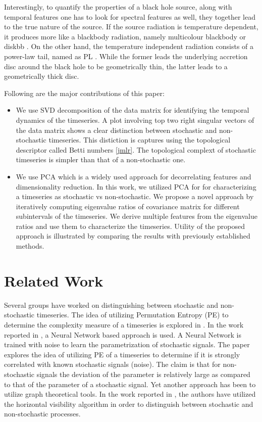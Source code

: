\documentclass[10pt,conference]{IEEEtran}
\begin{document}
Interestingly, to quantify the properties of a black hole source, along with temporal features one has to look for spectral features as well, they together lead to the true nature of the source. If the source radiation is temperature dependent, it produces more like a blackbody radiation, namely multicolour blackbody or diskbb \cite{Shakura1973}. On the other hand, the temperature independent radiation consists of a power-law tail, named as PL \cite{chakrabarti1995,narayan1994}.
While the former leads the underlying accretion disc around the black hole to be geometrically thin, the latter leads to a geometrically thick disc.


Following are the major contributions of this paper:
\begin{itemize}
  \item We use SVD decomposition of the data matrix for identifying the temporal dynamics of the timeseries. A plot involving top two right singular vectors of the data matrix shows a clear distinction between stochastic and non-stochastic timeseries. This distiction is captures using the topological descriptor called Betti numbers \ref{jmlr}. The topological complext of stochastic timeseries is simpler than that of a non-stochastic one.
  \item We use PCA which is a widely used approach for decorrelating features and dimensionality reduction. In this work, we utilized PCA for  for characterizing a timeseries as stochastic vs non-stochastic. We propose a novel approach by iteratively computing eigenvalue ratios  of covariance matrix for different subintervals of the timeseries. We  derive multiple features from the eigenvalue ratios and use them to characterize the timeseries. Utility of the proposed approach is illustrated by comparing the results with previously established methods.

\end{itemize}
\section{Related Work}
Several groups have worked on distinguishing between stochastic and non-stochastic timeseries. The idea of utilizing Permutation Entropy (PE) to determine the complexity measure of a timeseries is explored in \cite{Bandt2002}. In the work reported in \cite{Boaretto2021}, a Neural Network based approach is used. A Neural Network is trained with noise to learn the parametrization of stochastic signals. The paper explores the idea of utilizing PE of a timeseries to determine if it is strongly correlated with known stochastic signals (noise).   The claim is that for non-stochastic signals the deviation of the parameter is relatively large as compared to that of the parameter of a stochastic signal.  Yet another approach has been to utilize graph theoretical tools. In the work reported in \cite{lacasa2010}, the authors have utilized the horizontal visibility algorithm in order to distinguish between stochastic and non-stochastic processes.
\end{document}
